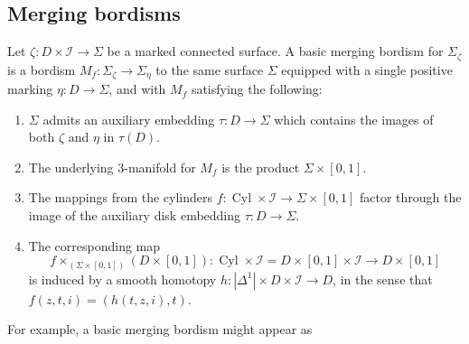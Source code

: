 \documentclass[reqno]{amsart}
\theoremstyle{definition}
\newcommand{\mcl}[1]{\mathcal{#1}}
\newcommand{\opn}[1]{\operatorname{#1}}
\renewcommand{\1}{\mathbf{1}}
\begin{document}
\subsection{Merging bordisms}
\label{sect:merge}

Let $\zeta:D\times \mcl{I}\to \Sigma$ be a marked connected surface.  A basic merging bordism for $\Sigma_{\zeta}$ is a bordism $M_f:\Sigma_{\zeta}\to \Sigma_{\eta}$ to the same surface $\Sigma$ equipped with a single positive marking $\eta:D\to \Sigma$, and with $M_f$ satisfying the following:
\begin{enumerate}
\item[(0)] $\Sigma$ admits an auxiliary embedding $\tau:D\to \Sigma$ which contains the images of both $\zeta$ and $\eta$ in $\tau(D)$.\vspace{1.5mm}
\item  The underlying $3$-manifold for $M_f$ is the product $\Sigma\times [0,1]$.\vspace{1.5mm}
\item The mappings from the cylinders $f:\opn{Cyl}\times \mcl{I}\to \Sigma\times [0,1]$ factor through the image of the auxiliary disk embedding $\tau:D\to \Sigma$.\vspace{1.5mm}
\item  The corresponding map
\[
f\times_{(\Sigma\times [0,1])}(D\times [0,1]):\opn{Cyl}\times\mcl{I}=D\times [0,1]\times \mcl{I}\to D\times [0,1]
\]
is induced by a smooth homotopy $h:|\Delta^1|\times D\times \mcl{I}\to D$, in the sense that $f(z,t,i)=(h(t,z,i),t)$.
\end{enumerate}
For example, a basic merging bordism might appear as
\end{document}

